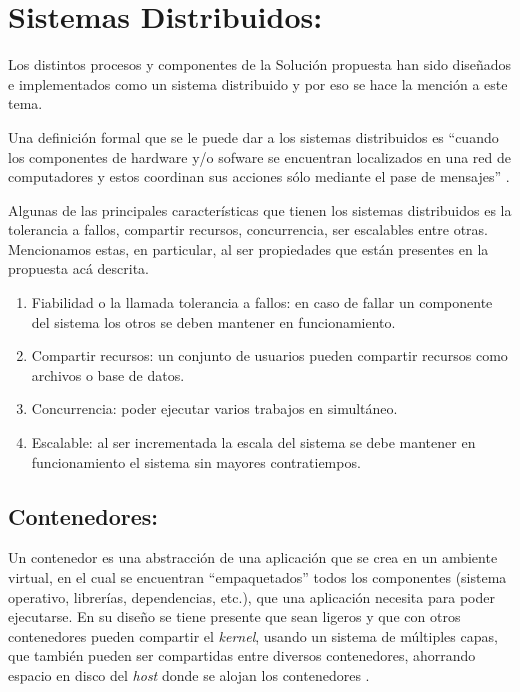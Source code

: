 \documentclass[
  10,
  openany]{book}
\begin{document}
\hypertarget{SD}{%
\section{Sistemas Distribuidos:}\label{SD}}

Los distintos procesos y componentes de la Solución propuesta han sido diseñados e implementados como un sistema distribuido y por eso se hace la mención a este tema.

Una definición formal que se le puede dar a los sistemas distribuidos es ``cuando los componentes de hardware y/o sofware se encuentran localizados en una red de computadores y estos coordinan sus acciones sólo mediante el pase de mensajes'' \citep{distribu2012}.

Algunas de las principales características que tienen los sistemas distribuidos es la tolerancia a fallos, compartir recursos, concurrencia, ser escalables \citep{czaja2018} entre otras. Mencionamos estas, en particular, al ser propiedades que están presentes en la propuesta acá descrita.

\begin{enumerate}
\def\labelenumi{\arabic{enumi}.}
\item
  Fiabilidad o la llamada tolerancia a fallos: en caso de fallar un componente del sistema los otros se deben mantener en funcionamiento.
\item
  Compartir recursos: un conjunto de usuarios pueden compartir recursos como archivos o base de datos.
\item
  Concurrencia: poder ejecutar varios trabajos en simultáneo.
\item
  Escalable: al ser incrementada la escala del sistema se debe mantener en funcionamiento el sistema sin mayores contratiempos.
\end{enumerate}

\hypertarget{contenedores}{%
\subsection{Contenedores:}\label{contenedores}}

Un contenedor es una abstracción de una aplicación que se crea en un ambiente virtual, en el cual se encuentran ``empaquetados'' todos los componentes (sistema operativo, librerías, dependencias, etc.), que una aplicación necesita para poder ejecutarse. En su diseño se tiene presente que sean ligeros y que con otros contenedores pueden compartir el \emph{kernel}, usando un sistema de múltiples capas, que también pueden ser compartidas entre diversos contenedores, ahorrando espacio en disco del \emph{host} donde se alojan los contenedores \citep{nüst2020}.
\end{document}
